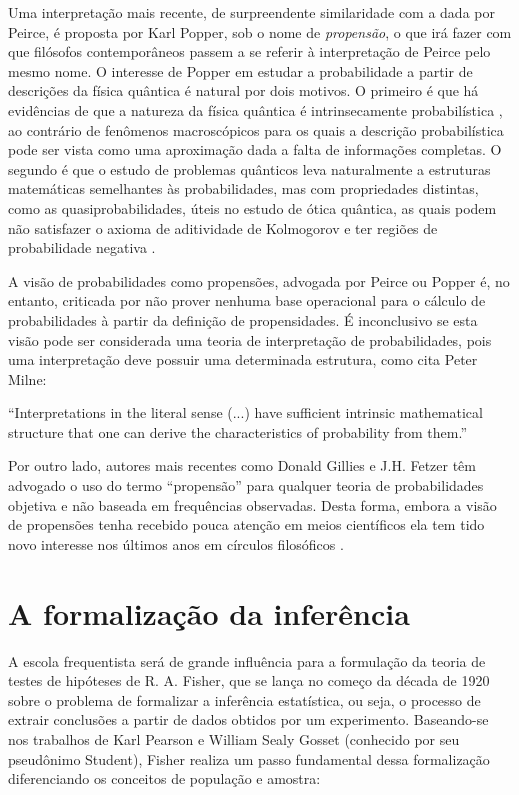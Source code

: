 Uma interpretação mais recente, de surpreendente similaridade com a dada por Peirce, é proposta por Karl Popper, sob o nome
de {\em propensão}, o que irá fazer com que filósofos contemporâneos passem a se referir à interpretação de Peirce pelo mesmo
nome.
O interesse de Popper em estudar a probabilidade a partir de descrições da física quântica é natural por dois motivos. O primeiro
é que há evidências de que a natureza da física quântica é intrinsecamente probabilística \citep{Gudder88}, ao contrário 
de fenômenos
macroscópicos para os quais a descrição probabilística pode ser vista como uma aproximação dada a falta de informações completas.
O segundo é que o estudo de problemas quânticos leva naturalmente a estruturas matemáticas semelhantes às probabilidades, mas
com	propriedades distintas, como as quasiprobabilidades, úteis no estudo de ótica quântica, as quais podem não satisfazer o
axioma de aditividade de Kolmogorov e ter regiões de probabilidade negativa \citep{Mandel95}.

A visão de probabilidades como propensões, advogada por Peirce ou Popper é, 
no entanto, criticada por não prover nenhuma base operacional para o cálculo de probabilidades à partir
da definição de propensidades. É inconclusivo se esta visão pode ser considerada uma teoria de interpretação
de probabilidades, pois uma interpretação deve possuir uma determinada estrutura, como cita Peter Milne:

``Interpretations in the literal sense (...) have sufficient intrinsic mathematical structure that one can derive
the characteristics of probability from them.''\citep{Milne93}

Por outro lado, autores mais recentes como Donald Gillies e J.H. Fetzer têm advogado o uso do termo ``propensão'' para
qualquer teoria de probabilidades objetiva e não baseada em frequências observadas.
Desta forma, embora a visão de propensões tenha recebido pouca atenção em meios científicos
ela tem tido novo interesse nos últimos anos em círculos filosóficos \citep{Gillies2000}.

\section{A formalização da inferência}

A escola frequentista será de grande influência para a formulação da teoria de testes de hipóteses de R. A. Fisher, que se
lança no começo da década de 1920 sobre o problema de formalizar a inferência estatística, ou seja, o processo de
extrair conclusões a partir de dados obtidos por um experimento. Baseando-se nos trabalhos de Karl Pearson e William Sealy Gosset
(conhecido por seu pseudônimo Student), Fisher realiza um passo fundamental dessa formalização
diferenciando os conceitos de população e amostra:

